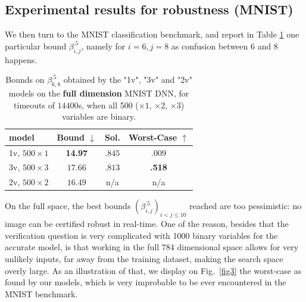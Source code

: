 	\subsection{Experimental results for robustness (MNIST)}
	
We then turn to the MNIST classification benchmark, and report 
in Table \ref{table.mnist} one particular bound $\beta^{.5}_{i,j}$, namely for $i=6,j=8$ as confusion between 6 and 8 happens.
	
	\begin{table}[h!]
		\centering
	\begin{tabular}{||l||c|c|c||}\hline\hline
		model &        Bound $\downarrow$ &  Sol. &      Worst-Case $\uparrow$ \\\hline \hline
		1v, $500 \times 1$ & {\bf 14.97} & $.845$ & $.009$ \\\hline 
		3v, $500 \times 3$ & $17.66$ & $.813$ & {\bf .518} \\\hline 
	    2v, $500 \times 2$ & $16.49$ & n/a & n/a \\\hline\hline	 
	\end{tabular}
	\caption{Bounds on $\beta^{.5}_{6,8}$ 
	obtained by the "1v", "3v" and "2v" models 
	on the {\bf full dimension} MNIST DNN, 
	for timeouts of $14400$s, when all 500 ($\times 1$, $\times 2$, $\times 3$) variables are binary.}
	\label{table.mnist}
\end{table}

On the full space, the best bounds $(\beta^{.5}_{i,j})_{i < j \leq 10}$ reached are too pessimistic: no image can be certified robust in real-time. One of the reason, besides that the verification question is very complicated with 1000 binary variables for the accurate model, is that working in the full $784$ dimensional space allows for very unlikely inputs, far away from the training dataset, making the search space overly large. As an illustration of that, we display on Fig.~\ref{fig3} the worst-case as found by our models, which is very improbable to be ever encountered in the MNIST benchmark.

